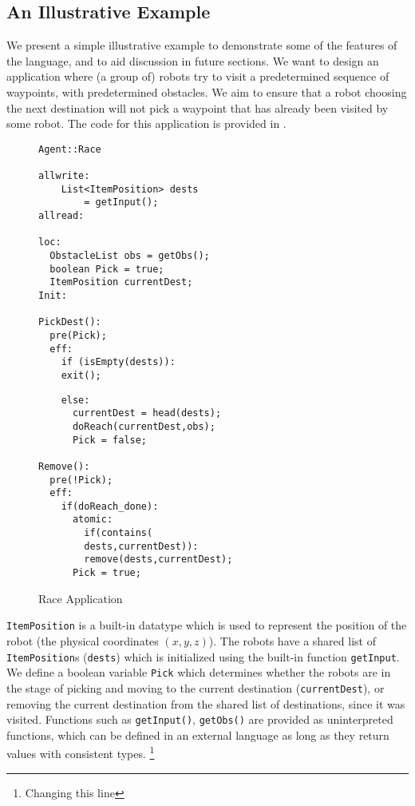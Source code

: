  \subsection[h]{An Illustrative Example}
\label{sect:Eg}
We present a simple illustrative example to demonstrate some of the features of the language, and to aid discussion in future sections. We want to design an application where (a group of) robots try to visit a predetermined sequence of waypoints, with predetermined obstacles. We aim to ensure that a robot choosing the next destination will not pick a waypoint that has already been visited by some robot. The code for this application is provided in .

\lstset{basicstyle=\scriptsize\ttfamily,breaklines=false}

\begin{figure}[ht!]
\label{fig:Race}
\noindent\begin{minipage}{.5\textwidth}

\begin{lstlisting}
Agent::Race

allwrite:
	List<ItemPosition> dests 
    	= getInput();
allread:

loc:
  ObstacleList obs = getObs();
  boolean Pick = true; 
  ItemPosition currentDest;
Init:

PickDest():
  pre(Pick);
  eff:
    if (isEmpty(dests)):
    exit();   
 \end{lstlisting}
 \end{minipage}\hfill
\noindent\begin{minipage}{.5\textwidth}

\begin{lstlisting}
    else:
      currentDest = head(dests);
      doReach(currentDest,obs);
      Pick = false;
      
Remove():
  pre(!Pick);
  eff:
    if(doReach_done):
      atomic:
        if(contains(
        dests,currentDest)):
        remove(dests,currentDest);
   	  Pick = true;
 \end{lstlisting}
 \end{minipage}\hfill
 \caption{Race Application}
 \end{figure}
\verb|ItemPosition| is a built-in datatype which is used to represent the position of the robot (the physical coordinates $(x,y,z)$). The robots have a shared list of \verb|ItemPosition|s (\verb|dests|) which is initialized using the built-in function \verb|getInput|. We define a boolean variable \verb|Pick| which determines whether the robots are in the stage of picking and moving to the current destination (\verb|currentDest|), or removing the current destination from the shared list of destinations, since it was visited. Functions such as \verb|getInput()|, \verb|getObs()| are provided as uninterpreted functions, which can be defined in an external language as long as they return values with consistent types. \footnote{Changing this line}

